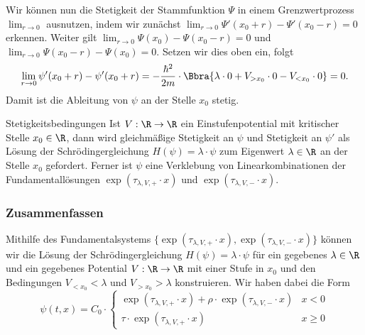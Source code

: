 \documentclass{subfiles}
\begin{document}
        Wir können nun die Stetigkeit der Stammfunktion $\Psi$ in einem Grenzwertprozess $\lim_{r\to 0}$ ausnutzen, indem wir zunächst $\lim_{r\to 0}\Psi'(x_0 + r) - \Psi'(x_0 - r) = 0$ erkennen. Weiter gilt $\lim_{r\to 0}\Psi(x_0) - \Psi(x_0 - r) = 0$ und $\lim_{r\to 0}\Psi(x_0 - r) - \Psi(x_0) = 0$. Setzen wir dies oben ein, folgt 
        \[
            \lim_{r\to 0}\psi'(x_0 + r)-\psi'(x_0 + r) = -\frac{\hbar^2}{2m}\cdot\Bbra{
                \lambda\cdot 0 + V_{>x_0}\cdot 0 - V_{<x_0}\cdot 0
            } = 0.
        \]
        Damit ist die Ableitung von $\psi$ an der Stelle $x_0$ stetig.

        \begin{mdef}{Stetigkeitsbedingungen}
            Ist $V:\R\to\R$ ein Einstufenpotential mit kritischer Stelle $x_0\in\R$, dann wird gleichmäßige Stetigkeit an $\psi$ und Stetigkeit an $\psi'$ als Lösung der Schrödingergleichung $H(\psi) = \lambda\cdot\psi$ zum Eigenwert $\lambda\in\R$ an der Stelle $x_0$ gefordert. Ferner ist $\psi$ eine Verklebung von Linearkombinationen der Fundamentallösungen $\exp(\tau_{\lambda,V,+}\cdot x)$ und $\exp(\tau_{\lambda,V,-}\cdot x)$. 
        \end{mdef}

    \subsubsection*{Zusammenfassen}
        Mithilfe des Fundamentalsystems $\{\exp(\tau_{\lambda,V,+}\cdot x),\exp(\tau_{\lambda,V,-}\cdot x)\}$ können wir die Lösung der Schrödingergleichung $H(\psi) = \lambda\cdot\psi$ für ein gegebenes $\lambda\in\R$ und ein gegebenes Potential $V:\R\to\R$ mit einer Stufe in $x_0$ und den Bedingungen $V_{<x_0}<\lambda$ und $V_{>x_0}>\lambda$ konstruieren. Wir haben dabei die Form 
        \[
            \psi(t,x) = C_0\cdot\begin{cases}
                \exp(\tau_{\lambda,V,+}\cdot x) + \rho\cdot\exp(\tau_{\lambda,V,-}\cdot x) & x < 0 \\
                \tau\cdot\exp(\tau_{\lambda,V,+}\cdot x) & x\geq 0
            \end{cases}
        \]
\end{document}
